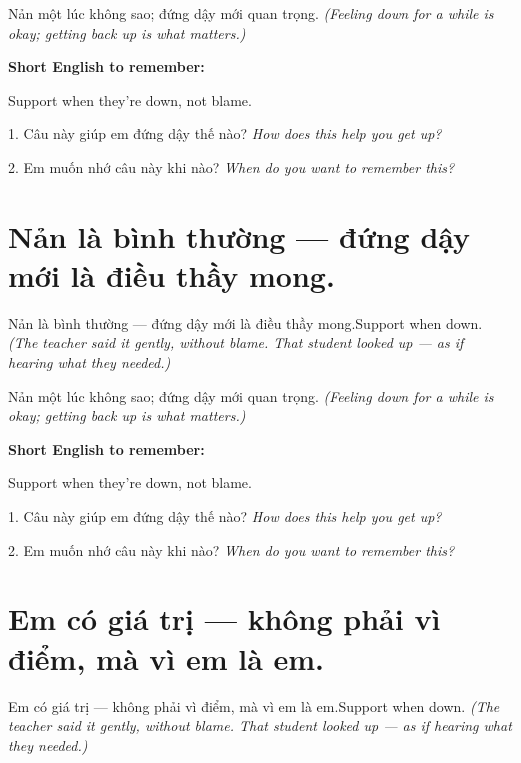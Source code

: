 \begin{baihoc}
Nản một lúc không sao; đứng dậy mới quan trọng.
\textit{(Feeling down for a while is okay; getting back up is what matters.)}
\end{baihoc}

\begin{ghinhoanh}
\textbf{Short English to remember:}

Support when they're down, not blame.

\end{ghinhoanh}

\begin{tuhocnhanh}
1. Câu này giúp em đứng dậy thế nào? \textit{How does this help you get up?}

2. Em muốn nhớ câu này khi nào? \textit{When do you want to remember this?}
\end{tuhocnhanh}
\ngancach


\section{Nản là bình thường — đứng dậy mới là điều thầy mong.}
\begin{truyen}{Nản là bình thường — đứng dậy mới là điều thầy mong.}{Support when down.}
\textit{(The teacher said it gently, without blame. That student looked up — as if hearing what they needed.)}
\end{truyen}

\begin{baihoc}
Nản một lúc không sao; đứng dậy mới quan trọng.
\textit{(Feeling down for a while is okay; getting back up is what matters.)}
\end{baihoc}

\begin{ghinhoanh}
\textbf{Short English to remember:}

Support when they're down, not blame.

\end{ghinhoanh}

\begin{tuhocnhanh}
1. Câu này giúp em đứng dậy thế nào? \textit{How does this help you get up?}

2. Em muốn nhớ câu này khi nào? \textit{When do you want to remember this?}
\end{tuhocnhanh}
\ngancach


\section{Em có giá trị — không phải vì điểm, mà vì em là em.}
\begin{truyen}{Em có giá trị — không phải vì điểm, mà vì em là em.}{Support when down.}
\textit{(The teacher said it gently, without blame. That student looked up — as if hearing what they needed.)}
\end{truyen}

